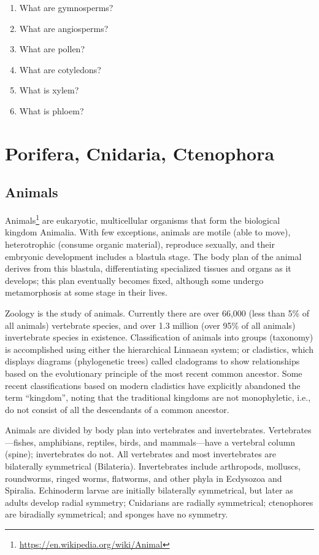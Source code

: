 \documentclass[]{book}
\providecommand{\tightlist}{%
  \setlength{\itemsep}{0pt}\setlength{\parskip}{0pt}}
\let\rmarkdownfootnote\footnote%
\def\footnote{\protect\rmarkdownfootnote}
\renewcommand{\href}[2]{#2\footnote{\url{#1}}}
\theoremstyle{definition}
\theoremstyle{definition}
\theoremstyle{definition}
\theoremstyle{remark}
\begin{document}
\begin{enumerate}
\def\labelenumi{\arabic{enumi}.}
\tightlist
\item
  What are gymnosperms?
\item
  What are angiosperms?
\item
  What are pollen?
\item
  What are cotyledons?
\item
  What is xylem?
\item
  What is phloem?
\end{enumerate}

\chapter{Porifera, Cnidaria,
Ctenophora}\label{porifera-cnidaria-ctenophora}

\section{Animals}\label{animals}

\href{https://en.wikipedia.org/wiki/Animal}{Animals} are eukaryotic,
multicellular organisms that form the biological kingdom Animalia. With
few exceptions, animals are motile (able to move), heterotrophic
(consume organic material), reproduce sexually, and their embryonic
development includes a blastula stage. The body plan of the animal
derives from this blastula, differentiating specialized tissues and
organs as it develops; this plan eventually becomes fixed, although some
undergo metamorphosis at some stage in their lives.

Zoology is the study of animals. Currently there are over 66,000
(less than 5\% of all animals) vertebrate species, and over 1.3 million
(over 95\% of all animals) invertebrate species in existence.
Classification of animals into groups (taxonomy) is accomplished using
either the hierarchical Linnaean system; or cladistics, which displays
diagrams (phylogenetic trees) called cladograms to show relationships
based on the evolutionary principle of the most recent common ancestor.
Some recent classifications based on modern cladistics have explicitly
abandoned the term ``kingdom'', noting that the traditional kingdoms are
not monophyletic, i.e., do not consist of all the descendants of a
common ancestor.

Animals are divided by body plan into vertebrates and invertebrates.
Vertebrates---fishes, amphibians, reptiles, birds, and mammals---have a
vertebral column (spine); invertebrates do not. All vertebrates and most
invertebrates are bilaterally symmetrical (Bilateria). Invertebrates
include arthropods, molluscs, roundworms, ringed worms, flatworms, and
other phyla in Ecdysozoa and Spiralia. Echinoderm larvae are initially
bilaterally symmetrical, but later as adults develop radial symmetry;
Cnidarians are radially symmetrical; ctenophores are biradially
symmetrical; and sponges have no symmetry.
\end{document}
